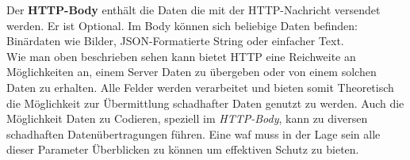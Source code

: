 Der \textbf{HTTP-Body} enthält die Daten die mit der HTTP-Nachricht versendet werden. 
Er ist Optional.
Im Body können sich beliebige Daten befinden: Binärdaten wie Bilder, JSON-Formatierte String oder einfacher Text.\\

Wie man oben beschrieben sehen kann bietet HTTP eine Reichweite an Möglichkeiten an, einem Server Daten zu übergeben oder von einem solchen Daten zu erhalten.
Alle Felder werden verarbeitet und bieten somit Theoretisch die Möglichkeit zur Übermittlung schadhafter Daten genutzt zu werden.
Auch die Möglichkeit Daten zu Codieren, speziell im \textit{HTTP-Body}, kann zu diversen schadhaften Datenübertragungen führen.
Eine \ac{waf} muss in der Lage sein alle dieser Parameter Überblicken zu können um effektiven Schutz zu bieten.

\pagebreak    